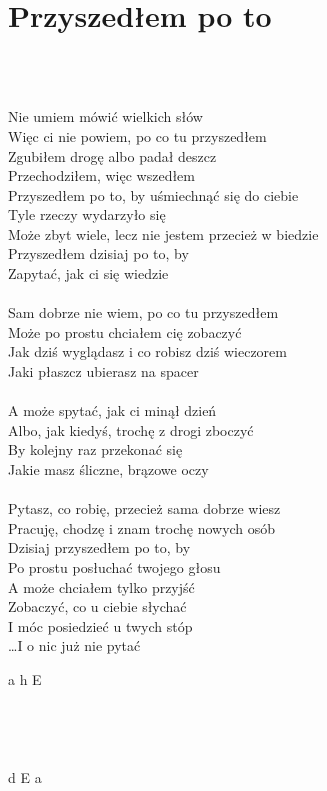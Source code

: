 \documentclass[a5paper, 10pt]{book}
\begin{document}
\newpage
\section{Przyszedłem po to}\textcolor{lightgray}{\textit{}}\\~\\
\begin{minipage}[t]{0.8\textwidth}
Nie umiem mówić wielkich słów\\
Więc ci nie powiem, po co tu przyszedłem\\
Zgubiłem drogę albo padał deszcz\\
Przechodziłem, więc wszedłem\\

\hspace*{5mm}Przyszedłem po to, by uśmiechnąć się do ciebie\\

Tyle rzeczy wydarzyło się\\
Może zbyt wiele, lecz nie jestem przecież w biedzie\\
Przyszedłem dzisiaj po to, by\\
Zapytać, jak ci się wiedzie\\
\\
Sam dobrze nie wiem, po co tu przyszedłem\\
Może po prostu chciałem cię zobaczyć\\
Jak dziś wyglądasz i co robisz dziś wieczorem\\
Jaki płaszcz ubierasz na spacer\\
\\
A może spytać, jak ci minął dzień\\
Albo, jak kiedyś, trochę z drogi zboczyć\\
By kolejny raz przekonać się\\
Jakie masz śliczne, brązowe oczy\\
\\
Pytasz, co robię, przecież sama dobrze wiesz\\
Pracuję, chodzę i znam trochę nowych osób\\
Dzisiaj przyszedłem po to, by\\
Po prostu posłuchać twojego głosu\\

A może chciałem tylko przyjść\\
Zobaczyć, co u ciebie słychać\\
I móc posiedzieć u twych stóp\\
\hspace*{1.4cm}\ldots I o nic już nie pytać\\
\end{minipage}
\begin{minipage}[t]{0.2\textwidth}
a h E\\~\\~\\~\\~\\
d E a\\

\end{minipage}
\end{document}
